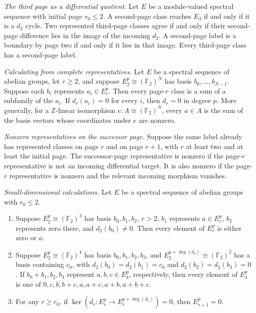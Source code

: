 \begin{theorem}
\label{sem:SpectralSequence:representative-expansion}
\textit{The third page as a differential quotient.} Let $E$ be a module-valued spectral sequence with initial page $r_0\leq2$. A second-page class reaches $E_3$ if and only if it is a $d_2$ cycle. Two represented third-page classes agree if and only if their second-page difference lies in the image of the incoming $d_2$. A second-page label is a boundary by page two if and only if it lies in that image. Every third-page class has a second-page label.

\textit{Calculating from complete representatives.} Let $E$ be a spectral sequence of abelian groups, let $r\geq2$, and suppose $E_2^p\cong(\mathbb F_2)^N$ has basis $b_0,\ldots,b_{N-1}$. Suppose each $b_i$ represents $a_i\in E_r^p$. Then every page-$r$ class is a sum of a subfamily of the $a_i$. If $d_r(a_i)=0$ for every $i$, then $d_r=0$ in degree $p$. More generally, for a $\mathbb Z$-linear isomorphism $e:A\cong(\mathbb F_2)^N$, every $a\in A$ is the sum of the basis vectors whose coordinates under $e$ are nonzero.

\textit{Nonzero representatives on the successor page.} Suppose the same label already has represented classes on page $r$ and on page $r+1$, with $r$ at least two and at least the initial page. The successor-page representative is nonzero if the page-$r$ representative is not an incoming differential target. It is also nonzero if the page-$r$ representative is nonzero and the relevant incoming morphism vanishes.

\textit{Small-dimensional calculations.} Let $E$ be a spectral sequence of abelian groups with $r_0\leq2$.
\begin{enumerate}
\item Suppose $E_2^p\cong(\mathbb F_2)^3$ has basis $b_0,b_1,b_2$, $r>2$, $b_1$ represents $a\in E_r^p$, $b_2$ represents zero there, and $d_2(b_0)\neq0$. Then every element of $E_r^p$ is either zero or $a$.
\item Suppose $E_2^p\cong(\mathbb F_2)^4$ has basis $b_0,b_1,b_2,b_3$, and $E_2^{p+\deg(d_2)}\cong(\mathbb F_2)^2$ has a basis containing $c_0$, with $d_2(b_0)=d_2(b_1)=c_0$ and $d_2(b_2)=d_2(b_3)=0$. If $b_0+b_1,b_2,b_3$ represent $a,b,c\in E_4^p$, respectively, then every element of $E_4^p$ is one of $0,c,b,b+c,a,a+c,a+b,a+b+c$.
\item For any $r\geq r_0$, if $\ker(d_r:E_r^p\to E_r^{p+\deg(d_r)})=0$, then $E_{r+1}^p=0$.
\end{enumerate}
\end{theorem}
